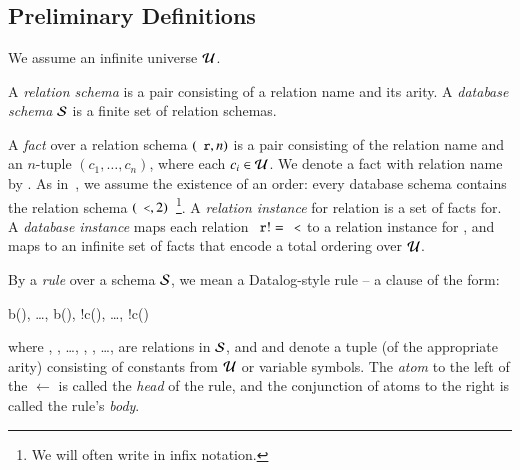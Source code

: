 \section{\large \bf \lang}
\label{sec:foundation}

\subsection{Preliminary Definitions}


We assume an infinite universe $\univ$.

A {\em relation schema} is a pair consisting of a relation name and its arity.
A {\em database schema} $\schema$ is a finite set of relation schemas.

A {\em fact} over a relation schema $(\dedalus{r}, n)$ is a pair consisting of the
relation name  and an $n$-tuple $(c_1,\ldots,c_n)$, where each $c_i \in \univ$.  We denote a fact with relation name  by .  As in~\cite{immerman-ptime}, we assume the existence of an order: every database schema contains the relation schema $(\dedalus{<},2)$~\footnote{We will often write \dedalus{<} in infix notation.}.  A {\em relation instance} for relation  is a set of facts for.  A {\em database instance} maps each relation $\dedalus{r} != \dedalus{<}$ to a relation instance for , and maps \dedalus{<} to an infinite set of \dedalus{<} facts that encode a total ordering over $\univ$.

By a {\em rule} over a schema $\schema$, we mean a Datalog-style rule -- a clause of the form:

\begin{Drules}
        {b(), \ldots, b(), !c(), \ldots, !c()}
\end{Drules}

where , , \ldots, ,
, \ldots,  are relations in
$\schema$, and  and 
denote a tuple (of the appropriate arity) consisting of
constants from $\univ$ or variable symbols.  The {\em atom} to the left of the $\leftarrow$ is called the {\em head} of the rule, and the conjunction of atoms to the right is called the rule's {\em body}.

